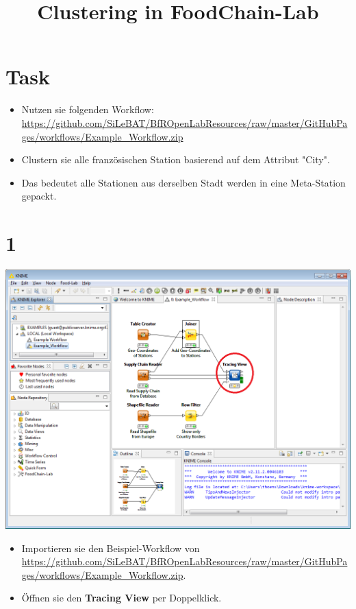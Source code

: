 \documentclass{beamer}
\title{Clustering in FoodChain-Lab}
\date{}
\begin{document}
\maketitle

\section{Task}
\begin{frame}
	\begin{itemize}
		\item Nutzen sie folgenden Workflow: \url{https://github.com/SiLeBAT/BfROpenLabResources/raw/master/GitHubPages/workflows/Example_Workflow.zip}
		\item Clustern sie alle französischen Station basierend auf dem Attribut "City".
		\item Das bedeutet alle Stationen aus derselben Stadt werden in eine Meta-Station gepackt.
	\end{itemize}
\end{frame}
 
\section{1}
\begin{frame}
	\begin{center}
  		\includegraphics[height=0.6\textheight]{1.png}
	\end{center}
	\begin{itemize}
		\item Importieren sie den Beispiel-Workflow von \url{https://github.com/SiLeBAT/BfROpenLabResources/raw/master/GitHubPages/workflows/Example_Workflow.zip}.
		\item Öffnen sie den \textbf{Tracing View} per Doppelklick.
	\end{itemize}
\end{frame}
\end{document}
